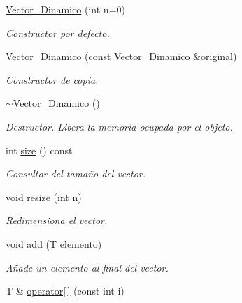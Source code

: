\begin{DoxyCompactItemize}
\item 
\mbox{\hyperlink{classVector__Dinamico_ae0a5b3fc342ecf8524cca578e0220c91}{Vector\+\_\+\+Dinamico}} (int n=0)
\begin{DoxyCompactList}\small\item\em Constructor por defecto. \end{DoxyCompactList}\item 
\mbox{\hyperlink{classVector__Dinamico_af555ebdf8afb084abee718a6514be8a7}{Vector\+\_\+\+Dinamico}} (const \mbox{\hyperlink{classVector__Dinamico}{Vector\+\_\+\+Dinamico}} \&original)
\begin{DoxyCompactList}\small\item\em Constructor de copia. \end{DoxyCompactList}\item 
\mbox{\label{classVector__Dinamico_a7a804c69350b7e514cd1b294c3ed9da1}} 
\mbox{\hyperlink{classVector__Dinamico_a7a804c69350b7e514cd1b294c3ed9da1}{$\sim$\+Vector\+\_\+\+Dinamico}} ()
\begin{DoxyCompactList}\small\item\em Destructor. Libera la memoria ocupada por el objeto. \end{DoxyCompactList}\item 
int \mbox{\hyperlink{classVector__Dinamico_af4050e799003ac92ab8da36d8bd5bb00}{size}} () const
\begin{DoxyCompactList}\small\item\em Consultor del tamaño del vector. \end{DoxyCompactList}\item 
void \mbox{\hyperlink{classVector__Dinamico_a1b7bf3f5b5dd748bbb55b8e2cd448c94}{resize}} (int n)
\begin{DoxyCompactList}\small\item\em Redimensiona el vector. \end{DoxyCompactList}\item 
void \mbox{\hyperlink{classVector__Dinamico_a048cf839b6f21862f200518adf0e3813}{add}} (T elemento)
\begin{DoxyCompactList}\small\item\em Añade un elemento al final del vector. \end{DoxyCompactList}\item 
T \& \mbox{\hyperlink{classVector__Dinamico_a93666466d9a2bf8bc4f2a217d5f94bf9}{operator\mbox{[}$\,$\mbox{]}}} (const int i)

\end{DoxyCompactItemize}
